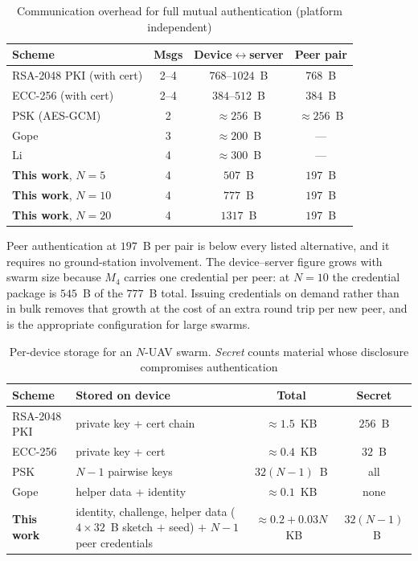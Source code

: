 \documentclass[11pt,a4paper]{article}
\begin{document}
\begin{table}[H]
\centering
\caption{Communication overhead for full mutual authentication (platform
independent)}
\label{tab:cmp_overhead}
\small
\begin{tabular}{@{}p{3.5cm}ccc@{}}
\toprule
\textbf{Scheme} & \textbf{Msgs} & \textbf{Device$\leftrightarrow$server} &
\textbf{Peer pair} \\
\midrule
RSA-2048 PKI (with cert) & 2--4 & $768$--$1024$~B & $768$~B \\
ECC-256 (with cert) & 2--4 & $384$--$512$~B & $384$~B \\
PSK (AES-GCM) & 2 & $\approx 256$~B & $\approx 256$~B \\
Gope~\cite{puf_lightweight_uav} & 3 & $\approx 200$~B & --- \\
Li~\cite{puf_uav_cross_domain} & 4 & $\approx 300$~B & --- \\
\midrule
\textbf{This work}, $N{=}5$ & 4 & $507$~B & $197$~B \\
\textbf{This work}, $N{=}10$ & 4 & $777$~B & $197$~B \\
\textbf{This work}, $N{=}20$ & 4 & $1317$~B & $197$~B \\
\bottomrule
\end{tabular}
\normalsize
\end{table}

Peer authentication at $197$~B per pair is below every listed alternative, and it
requires no ground-station involvement. The device--server figure grows with swarm
size because $M_4$ carries one credential per peer: at $N=10$ the credential
package is $545$~B of the $777$~B total. Issuing credentials on demand rather than
in bulk removes that growth at the cost of an extra round trip per new peer, and is
the appropriate configuration for large swarms.

\begin{table}[H]
\centering
\caption{Per-device storage for an $N$-UAV swarm. \emph{Secret} counts material
whose disclosure compromises authentication}
\label{tab:cmp_storage}
\small
\begin{tabular}{@{}p{3.4cm}p{4.2cm}cc@{}}
\toprule
\textbf{Scheme} & \textbf{Stored on device} & \textbf{Total} & \textbf{Secret} \\
\midrule
RSA-2048 PKI & private key + cert chain & $\approx 1.5$~KB & $256$~B \\
ECC-256 & private key + cert & $\approx 0.4$~KB & $32$~B \\
PSK & $N-1$ pairwise keys & $32(N{-}1)$~B & all \\
Gope~\cite{puf_lightweight_uav} & helper data + identity & $\approx 0.1$~KB & none \\
\midrule
\textbf{This work} & identity, challenge, helper data
($4\times32$~B sketch $+$ seed) $+$ $N{-}1$ peer credentials &
$\approx 0.2 + 0.03N$~KB & $32(N{-}1)$~B \\
\bottomrule
\end{tabular}
\normalsize
\end{table}
\end{document}
